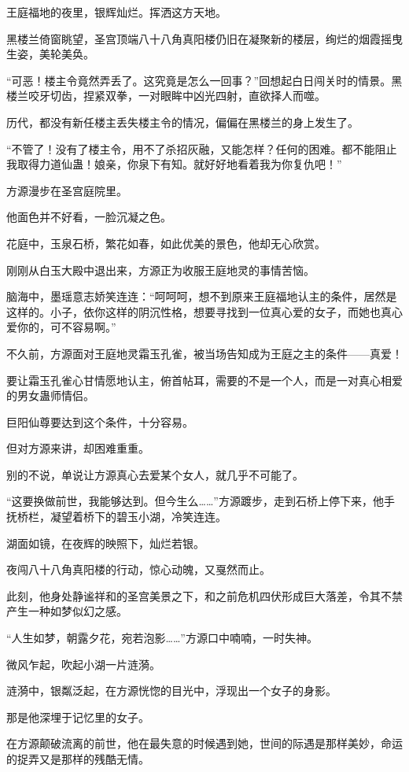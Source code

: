 \begin{this_body}
王庭福地的夜里，银辉灿烂。挥洒这方天地。

黑楼兰倚窗眺望，圣宫顶端八十八角真阳楼仍旧在凝聚新的楼层，绚烂的烟霞摇曳生姿，美轮美奂。

“可恶！楼主令竟然弄丢了。这究竟是怎么一回事？”回想起白日闯关时的情景。黑楼兰咬牙切齿，捏紧双拳，一对眼眸中凶光四射，直欲择人而噬。

历代，都没有新任楼主丢失楼主令的情况，偏偏在黑楼兰的身上发生了。

“不管了！没有了楼主令，用不了杀招灰融，又能怎样？任何的困难。都不能阻止我取得力道仙蛊！娘亲，你泉下有知。就好好地看着我为你复仇吧！”

方源漫步在圣宫庭院里。

他面色并不好看，一脸沉凝之色。

花庭中，玉泉石桥，繁花如春，如此优美的景色，他却无心欣赏。

刚刚从白玉大殿中退出来，方源正为收服王庭地灵的事情苦恼。

脑海中，墨瑶意志娇笑连连：“呵呵呵，想不到原来王庭福地认主的条件，居然是这样的。小子，依你这样的阴沉性格，想要寻找到一位真心爱的女子，而她也真心爱你的，可不容易啊。”

不久前，方源面对王庭地灵霜玉孔雀，被当场告知成为王庭之主的条件——真爱！

要让霜玉孔雀心甘情愿地认主，俯首帖耳，需要的不是一个人，而是一对真心相爱的男女蛊师情侣。

巨阳仙尊要达到这个条件，十分容易。

但对方源来讲，却困难重重。

别的不说，单说让方源真心去爱某个女人，就几乎不可能了。

“这要换做前世，我能够达到。但今生么……”方源踱步，走到石桥上停下来，他手抚桥栏，凝望着桥下的碧玉小湖，冷笑连连。

湖面如镜，在夜辉的映照下，灿烂若银。

夜闯八十八角真阳楼的行动，惊心动魄，又戛然而止。

此刻，他身处静谧祥和的圣宫美景之下，和之前危机四伏形成巨大落差，令其不禁产生一种如梦似幻之感。

“人生如梦，朝露夕花，宛若泡影……”方源口中喃喃，一时失神。

微风乍起，吹起小湖一片涟漪。

涟漪中，银粼泛起，在方源恍惚的目光中，浮现出一个女子的身影。

那是他深埋于记忆里的女子。

在方源颠破流离的前世，他在最失意的时候遇到她，世间的际遇是那样美妙，命运的捉弄又是那样的残酷无情。


\end{this_body}
